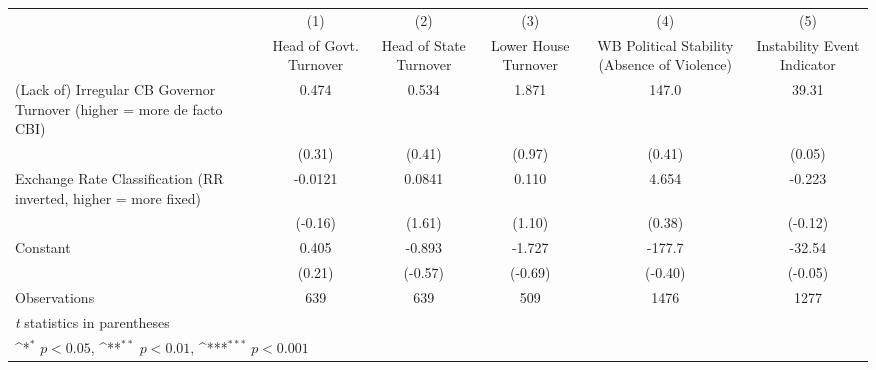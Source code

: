 {
\def\sym#1{\ifmmode^{#1}\else\(^{#1}\)\fi}
\begin{tabular}{l*{5}{c}}
\hline\hline
                &\multicolumn{1}{c}{(1)}&\multicolumn{1}{c}{(2)}&\multicolumn{1}{c}{(3)}&\multicolumn{1}{c}{(4)}&\multicolumn{1}{c}{(5)}\\
                &\multicolumn{1}{c}{Head of Govt. Turnover}&\multicolumn{1}{c}{Head of State Turnover}&\multicolumn{1}{c}{Lower House Turnover}&\multicolumn{1}{c}{WB Political Stability (Absence of Violence)}&\multicolumn{1}{c}{Instability Event Indicator}\\
\hline
(Lack of) Irregular CB Governor Turnover (higher = more de facto CBI)&    0.474         &    0.534         &    1.871         &    147.0         &    39.31         \\
                &   (0.31)         &   (0.41)         &   (0.97)         &   (0.41)         &   (0.05)         \\
[1em]
Exchange Rate Classification (RR inverted, higher = more fixed)&  -0.0121         &   0.0841         &    0.110         &    4.654         &   -0.223         \\
                &  (-0.16)         &   (1.61)         &   (1.10)         &   (0.38)         &  (-0.12)         \\
[1em]
Constant        &    0.405         &   -0.893         &   -1.727         &   -177.7         &   -32.54         \\
                &   (0.21)         &  (-0.57)         &  (-0.69)         &  (-0.40)         &  (-0.05)         \\
\hline
Observations    &      639         &      639         &      509         &     1476         &     1277         \\
\hline\hline
\multicolumn{6}{l}{\footnotesize \textit{t} statistics in parentheses}\\
\multicolumn{6}{l}{\footnotesize \sym{*} \(p<0.05\), \sym{**} \(p<0.01\), \sym{***} \(p<0.001\)}\\
\end{tabular}
}
